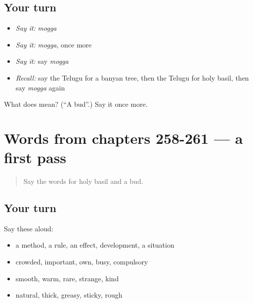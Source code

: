 \subsection*{Your turn}
\begin{itemize}
\raggedright
  \item \emph{Say it:} \emph{mogga}
  \item \emph{Say it:} \emph{mogga}, once more
  \item \emph{Say it:} say \emph{mogga}
  \item \emph{Recall:} say the Telugu for a banyan tree, then the Telugu for holy basil, then say \emph{mogga} again
\end{itemize}

\begin{tcolorbox}[breakable,colback=teal!4,colframe=teal!35!black,title={Before you move on}]
What does  mean? (\textquotedblleft{}A bud\textquotedblright{}.) Say it once more.
\end{tcolorbox}
\section[(dialogue)]{Words from chapters 258-261 — a first pass}

\label{lesson:TE-R266-first-pass-words-from-chapters-258-261}



\begin{quote}
Say the words for holy basil and a bud.
\end{quote}

\subsection*{Your turn}
Say these aloud:

\begin{itemize}
\raggedright
  \item a method, a rule, an effect, development, a situation
  \item crowded, important, own, busy, compulsory
  \item smooth, warm, rare, strange, kind
  \item natural, thick, greasy, sticky, rough
\end{itemize}

